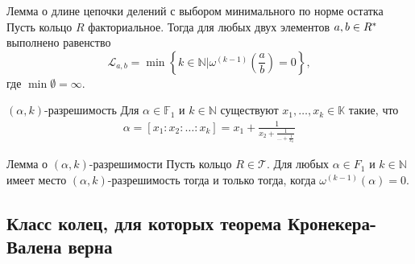\documentclass[8pt, xcolor=x11names]{beamer}
\begin{document}
\begin{frame}
    \begin{block}{Лемма о длине цепочки делений с выбором минимального по норме остатка}
        Пусть кольцо $R$ факториальное.
        Тогда для любых двух элементов $a, b \in R^{*}$ выполнено равенство
        \begin{equation*}
            \mathcal{L}_{a, b} = \min\left\{
                k \in \mathbb{N} \big| \omega^{(k-1)}\left(\frac{a}{b}\right) = 0
            \right\},
        \end{equation*}
        где $\min \emptyset = \infty$.
    \end{block}

    \begin{block}{$(\alpha, k)$-разрешимость}
        Для $\alpha\in\mathbb{F}_1$ и $k\in\mathbb{N}$ существуют $x_{1},\ldots,x_{k}\in\mathbb{K}$ такие, что
        \begin{eqnarray*}
            \alpha = [x_{1}:x_{2}:\ldots:x_{k}] = x_{1} + \frac{1}{
                x_{2} + \frac{1}{
                    \dots + \frac{1}{x_{k}}
                }
            }
        \end{eqnarray*}
    \end{block}

    \begin{block}{Лемма о $(\alpha, k)$-разрешимости}
        Пусть кольцо $R \in \mathcal{T}$.
        Для любых $\alpha \in F_1$ и $k \in \mathbb{N}$ имеет место $(\alpha, k)$-разрешимость тогда и только тогда, когда $\omega^{(k-1)}(\alpha) = 0$.
    \end{block}
\end{frame}

\subsection{Класс колец, для которых теорема Кронекера-Валена верна}
\end{document}
